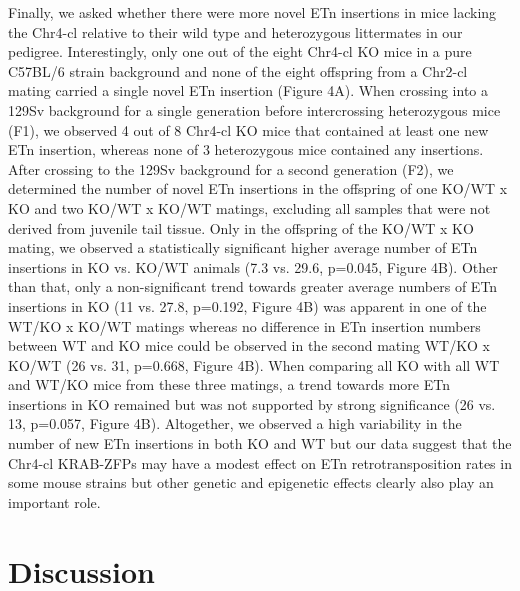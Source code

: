 \documentclass[11pt,a4paper]{article}
\begin{document}
Finally, we asked whether there were more novel ETn insertions in mice lacking the Chr4-cl relative to their wild type and heterozygous littermates in our pedigree. Interestingly, only one out of the eight Chr4-cl KO mice in a pure C57BL/6 strain background and none of the eight offspring from a Chr2-cl mating carried a single novel ETn insertion (Figure 4A). When crossing into a 129Sv background for a single generation before intercrossing heterozygous mice (F1), we observed 4 out of 8 Chr4-cl KO mice that contained at least one new ETn insertion, whereas none of 3 heterozygous mice contained any insertions. After crossing to the 129Sv background for a second generation (F2), we determined the number of novel ETn insertions in the offspring of one KO/WT x KO and two KO/WT x KO/WT matings, excluding all samples that were not derived from juvenile tail tissue. Only in the offspring of the KO/WT x KO mating, we observed a statistically significant higher average number of ETn insertions in KO vs. KO/WT animals (7.3 vs. 29.6, p=0.045, Figure 4B). Other than that, only a non-significant trend towards greater average numbers of ETn insertions in KO (11 vs. 27.8, p=0.192, Figure 4B) was apparent in one of the WT/KO x KO/WT matings whereas no difference in ETn insertion numbers between WT and KO mice could be observed in the second mating WT/KO x KO/WT (26 vs. 31, p=0.668, Figure 4B). When comparing all KO with all WT and WT/KO mice from these three matings, a trend towards more ETn insertions in KO remained but was not supported by strong significance (26 vs. 13, p=0.057, Figure 4B). Altogether, we observed a high variability in the number of new ETn insertions in both KO and WT but our data suggest that the Chr4-cl KRAB-ZFPs may have a modest effect on ETn retrotransposition rates in some mouse strains but other genetic and epigenetic effects clearly also play an important role.

\section{Discussion}
\end{document}
